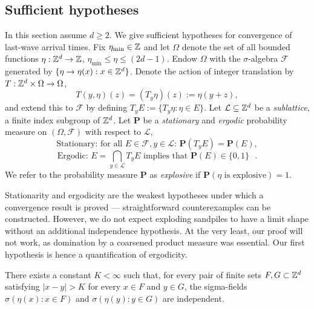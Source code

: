 \documentclass[12pt]{amsart}
\begin{document}
\subsection{Sufficient hypotheses} \label{sec:sufficient_hypotheses}
In this section assume $d\geq2$. We give sufficient hypotheses for convergence of last-wave arrival times. 
Fix $\eta_{\min} \in \mathbb{Z}$ and let $\Omega$ denote the set of all bounded functions $\eta: \mathbb{Z}^d \to \mathbb{Z}$, $\eta_{\min} \leq \eta \leq (2 d- 1)$.
Endow $\Omega$ with the $\sigma$-algebra $\mathcal{F}$ generated by $\{ \eta \to \eta(x) : x \in \mathbb{Z}^d\}$. Denote the action of integer translation by $T: \mathbb{Z}^d \times \Omega \to \Omega$, 
\[
T(y, \eta)(z) = (T_y \eta)(z) := \eta(y + z),
\]
and extend this to $\mathcal{F}$ by defining  $T_y E := \{ T_y \eta : \eta \in E\}$.
Let $\mathcal{L} \subseteq \mathbb{Z}^d$ be a {\it sublattice}, a finite index subgroup of $\mathbb{Z}^d$.
Let $\mathbf{P}$ be a {\it stationary} and {\it ergodic} probability measure on $(\Omega, \mathcal{F})$
with respect to $\mathcal{L}$,
\begin{equation}
\mbox{Stationary: for all $E \in \mathcal{F}, y \in \mathcal{L}$: } \mathbf{P}(T_y E) = \mathbf{P}(E),
\end{equation}
\begin{equation}
\mbox{Ergodic:  $E = \bigcap_{y \in \mathcal{L}} T_y E$ implies that $\mathbf{P}(E) \in \{0,1\}$ }.
\end{equation}
We refer to the probability measure $\mathbf{P}$ as {\it explosive} if $\mathbf{P}(\eta \mbox{ is explosive}) = 1$.

Stationarity and ergodicity are the weakest hypotheses under which a convergence result is proved --- straightforward 
counterexamples can be constructed.
However, we do not expect exploding sandpiles to have a limit shape without an additional independence hypothesis. At the very least, 
our proof will not work, as domination by a coarsened product measure was essential. Our first hypothesis is hence a quantification of ergodicity. 

\begin{hyp} \label{hyp:finite_range_of_dependence}
	There exists a constant $K < \infty$ such that, for every pair of finite sets $F,G \subset \mathbb{Z}^d$ satisfying $|x-y| > K$ for every $x \in F$ and $y \in G$, the sigma-fields $\sigma(\eta(x):x\in F)$ and $\sigma(\eta(y):y\in G)$ are independent. 
\end{hyp}
\end{document}
